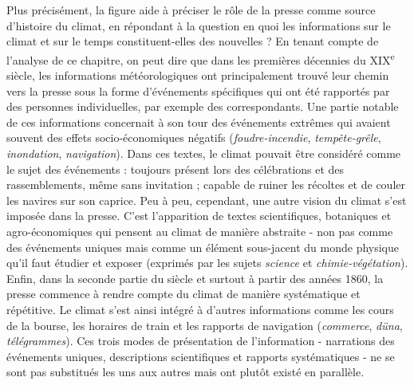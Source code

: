 \documentclass[a4paper,twoside,12pt]{article}
\begin{document}
Plus précisément, la figure aide à préciser le rôle de la presse comme source d'histoire du climat, en répondant à la question \og en quoi les informations sur le climat et sur le temps constituent-elles des nouvelles ? \fg{} En tenant compte de l'analyse de ce chapitre, on peut dire que dans les premières décennies du XIX\textsuperscript{e} siècle, les informations météorologiques ont principalement trouvé leur chemin vers la presse sous la forme d'événements spécifiques qui ont été rapportés par des personnes individuelles, par exemple des correspondants. Une partie notable de ces informations concernait à son tour des événements extrêmes qui avaient souvent des effets socio-économiques négatifs (\textit{foudre-incendie}, \textit{tempête-grêle}, \textit{inondation}, \textit{navigation}). Dans ces textes, le climat pouvait être considéré comme le sujet des événements : toujours présent lors des célébrations et des rassemblements, même sans invitation ; capable de ruiner les récoltes et de couler les navires sur son caprice. Peu à peu, cependant, une autre vision du climat s'est imposée dans la presse. C'est l'apparition de textes scientifiques, botaniques et agro-économiques qui pensent au climat de manière abstraite - non pas comme des événements uniques mais comme un élément sous-jacent du monde physique qu'il faut étudier et exposer (exprimés par les sujets \textit{science} et \textit{chimie-végétation}). Enfin, dans la seconde partie du siècle et surtout à partir des années 1860, la presse commence à rendre compte du climat de manière systématique et répétitive. Le climat s'est ainsi intégré à d'autres informations comme les cours de la bourse, les horaires de train et les rapports de navigation (\textit{commerce}, \textit{düna}, \textit{télégrammes}). Ces trois modes de présentation de l'information - narrations des événements uniques, descriptions scientifiques et rapports systématiques - ne se sont pas substitués les uns aux autres mais ont plutôt existé en parallèle.
\end{document}
